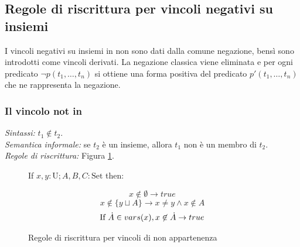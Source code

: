 \documentclass[12pt,a4paper,openright]{book}  %
\begin{document}

\subsection{Regole di riscrittura per vincoli negativi su insiemi}
\label{subsec:clpbasedlang_lset_rewriteneg}

I vincoli negativi su insiemi in \lset{} non sono dati dalla comune
negazione, bensì sono introdotti come vincoli derivati. La negazione
classica viene eliminata e per ogni predicato $\neg p(t_1, \ldots,
t_n)$ si ottiene una forma positiva del predicato $p'(t_1, \ldots,
t_n)$ che ne rappresenta la negazione.

\subsubsection{Il vincolo not in}

\textit{Sintassi:} $t_1 \not\in t_2$.\\
\noindent\textit{Semantica informale:} se $t_2$ è un insieme, allora $t_1$ non è un membro di $t_2$.\\
\noindent\textit{Regole di riscrittura:} Figura \ref{fig:notin_constraints}.

\begin{figure}
	\begin{tcolorbox}[colframe=black, colback=white, sharp corners]
		\setcounter{equation}{3}
		\renewcommand{\theequation}{$\in$\textsubscript{\arabic{equation}}}

		If $x, y: \text{U}; A, B, C: \text{Set}$ then:

		\begin{equation}
		x \not\in \emptyset \to true
		\end{equation}
		\begin{equation}
		x \not\in \{ y \sqcup A \} \to x \neq y \land x \not\in A
		\end{equation}
		\begin{equation}
		\text{If } \dot{A} \in vars(x), x \not\in \dot{A} \to true
		\end{equation}

	\end{tcolorbox}

	\caption{Regole di riscrittura per vincoli di non appartenenza}
	\label{fig:notin_constraints}
\end{figure}
\end{document}
